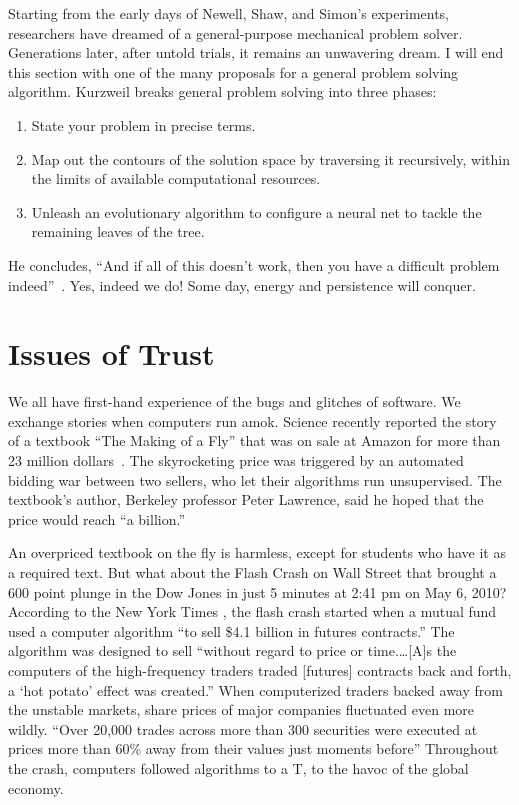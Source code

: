 \documentclass{llncs}
\begin{document}
\bigskip

Starting from the early days of Newell, Shaw, and Simon's experiments, researchers
have dreamed of a general-purpose mechanical problem solver.  Generations later,
after untold trials, it remains an unwavering dream.  I will end this section
with one of the many proposals for a general problem solving algorithm.
Kurzweil breaks general problem solving into three phases:
\begin{enumerate} 
\item State your problem in precise terms.
\item Map out the contours of the solution space by traversing it
  recursively, within the limits of available computational resources.
\item Unleash an evolutionary algorithm to configure a neural net to
  tackle the remaining leaves of the tree.
\end{enumerate}
He concludes, ``And if all of this doesn't work, then you have a
difficult problem indeed''~\cite{Ku99}.  Yes, indeed we do!  Some day,
energy and persistence will conquer.



\newpage
\section{Issues of Trust}\label{sec:trust}

We all have first-hand experience of the bugs and glitches of
software.  We exchange stories when computers run amok.  Science
recently reported the story of a textbook ``The Making of a Fly'' that
was on sale at Amazon for more than 23 million dollars~\cite{Sci11}.  The
skyrocketing price was triggered by an automated bidding war between
two sellers, who let their algorithms run unsupervised.  The textbook's author,
Berkeley professor Peter Lawrence, said he hoped that the price would
reach ``a billion.''


An overpriced textbook on the fly is harmless, except for students who
have it as a required text.  But what about the Flash Crash on Wall
Street that brought a 600 point plunge in the Dow Jones in just 5
minutes at 2:41 pm on May 6, 2010?  According to the New York Times \cite{NYT2010}, the flash
crash started when a mutual fund used a computer algorithm ``to sell
\$4.1 billion in futures contracts.''  The algorithm was designed to
sell ``without regard to price or time.\dots [A]s the computers of the
high-frequency traders traded [futures] contracts back and forth, a
`hot potato' effect was created.''  When computerized traders backed
away from the unstable markets, share prices of major companies
fluctuated even more wildly. ``Over 20,000 trades across more than 300
securities were executed at prices more than 60\% away from their
values just moments before'' \cite{SEC2010} Throughout the crash,
computers followed algorithms to a T, to the havoc
of the global economy. 
\end{document}
